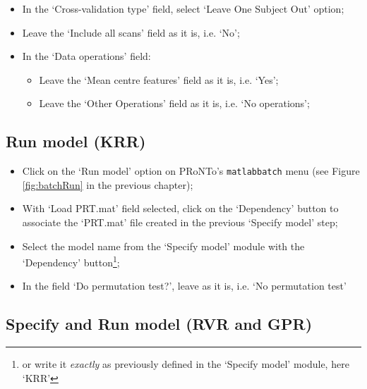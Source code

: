\begin{itemize}
\begin{itemize}
   \end{itemize}
   
   \item In the `Cross-validation type' field, select `Leave One Subject Out' option;
	
	\item Leave the `Include all scans' field as it is, i.e. `No';

	\item In the `Data operations' field:
	
		\begin{itemize}
		\item  Leave the `Mean centre features' field as it is, i.e. `Yes'; 
				
		\item  Leave the `Other Operations' field as it is, i.e. `No operations';
		\end{itemize}
	
\end{itemize}


\subsection{Run model (KRR)}

\begin{itemize}

    \item Click on the `Run model' option on PRoNTo's {\tt matlabbatch} menu (see Figure \ref{fig:batchRun} in the previous chapter);
    
   	\item  With `Load PRT.mat' field selected, click on the `Dependency' button to associate the `PRT.mat' file created in the previous `Specify model' step;

    \item Select the model name from the `Specify model' module with the `Dependency' button\footnote{or write it {\it exactly} as previously defined in the `Specify model' module, here `KRR'};
    
    \item In the field `Do permutation test?', leave as it is, i.e. `No permutation test' 

       \end{itemize}

\subsection{Specify and Run model (RVR and GPR)}


